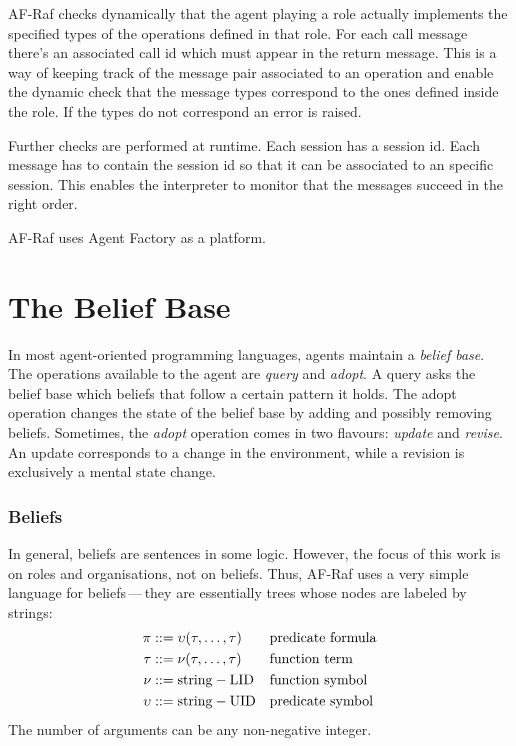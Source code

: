\documentclass[a4paper,12pt,oneside,fleqn]{book} %
\begin{document}
AF-Raf checks dynamically that the agent playing a role actually implements
the specified types of the operations defined in that role.  For each call
message there's an associated call id which must appear in the return
message. This is a way of keeping track of the message pair associated to
an operation and enable the dynamic check that the message types correspond
to the ones defined inside the role. If the types do not correspond an
error is raised.

Further checks are performed at runtime. Each session has a session id.
Each message has to contain the session id so that it can be associated to
an specific session. This enables the interpreter to monitor that the
messages succeed in the right order.

AF-Raf uses Agent Factory as a platform. 
\section{The Belief Base}\label{sec:c-belief} %

In most agent-oriented programming languages, agents maintain a
\emph{belief base}.  The operations available to the agent are
\textit{query} and \textit{adopt}.  A query asks the belief base which
beliefs that follow a certain pattern it holds.  The adopt operation
changes the state of the belief base by adding and possibly removing
beliefs.  Sometimes, the {\it adopt\/} operation comes in two flavours:
{\it update\/} and {\it revise}.  An update corresponds to a change in the
environment, while a revision is exclusively a mental state change.

\subsubsection{Beliefs}

In general, beliefs are sentences in some logic.  However, the focus of
this work is on roles and organisations, not on beliefs.  Thus, AF-Raf uses
a very simple language for beliefs\,---\,they are essentially trees whose
nodes are labeled by strings: \begin{align} \pi &::=
\upsilon(\tau,\ldots,\tau) && \text{predicate formula} \\ \tau &::= \nu(\tau,\ldots,\tau)
&& \text{function term} \\ \nu  &::= {\rm string-LID} &&\text{function symbol}
\\ \upsilon  &::= {\rm string-UID} &&\text{predicate symbol} \end{align} The number of arguments can be any non-negative integer.
\end{document}
